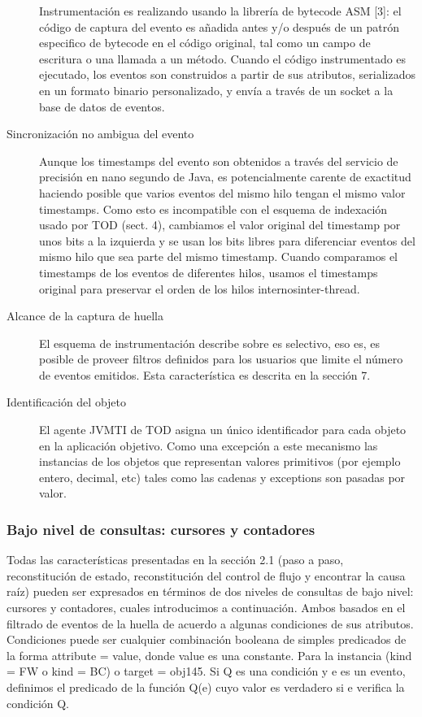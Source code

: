\documentclass[12pt,a4paper]{report}
\begin{document}
\begin{description}

Instrumentación es realizando usando la librería de bytecode ASM [3]:  el código de captura  del evento es añadida antes y/o después de un patrón especifico de bytecode en el código original, tal como un campo de escritura o una llamada a un método.  Cuando el código instrumentado es ejecutado, los eventos son construidos a partir de sus atributos, serializados en un formato binario personalizado, y envía a través de un socket a la base de datos de eventos.

	\item[Sincronización no ambigua del evento] Aunque los timestamps del evento son obtenidos a través del servicio de precisión en nano segundo de Java, es potencialmente carente de exactitud haciendo posible que varios eventos del mismo hilo tengan el mismo valor timestamps.  Como esto es incompatible con el esquema de indexación usado por TOD (sect. 4), cambiamos el valor original del timestamp por unos bits a la izquierda y se usan los bits libres para diferenciar eventos del mismo hilo que sea parte del mismo timestamp.  Cuando comparamos el timestamps de los eventos de diferentes hilos, usamos el timestamps original para preservar el orden de los hilos internos{inter-thread}.

	\item[Alcance de la captura de huella] El esquema de instrumentación describe sobre es selectivo, eso es, es posible de proveer filtros definidos para los usuarios que limite el número de eventos emitidos.  Esta característica es descrita en la sección 7.

	\item[Identificación del objeto] El agente JVMTI de TOD asigna un único identificador para cada objeto en la aplicación objetivo.  Como una excepción a este mecanismo las instancias de los objetos que representan valores primitivos (por ejemplo entero, decimal, etc) tales como las cadenas y exceptions son pasadas por valor.
\end{description}

			\subsubsection[Bajo nivel de consultas]{Bajo nivel de consultas: cursores y contadores}

	Todas las características presentadas en la sección 2.1 (paso a paso, reconstitución de estado, reconstitución del control de flujo y encontrar la causa raíz) pueden ser expresados en términos de dos niveles de consultas de bajo nivel:  cursores y contadores, cuales introducimos a continuación.  Ambos basados en el filtrado de eventos de la huella de acuerdo a algunas condiciones de sus atributos.  Condiciones puede ser cualquier combinación booleana de simples predicados de la forma attribute = value, donde value es una constante.  Para la instancia (kind = FW o kind = BC) o target = obj145.  Si Q es una condición y e es un evento, definimos el predicado de la función Q(e) cuyo valor es verdadero si e verifica la condición Q.
\end{document}
